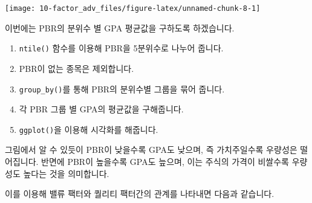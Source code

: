 \documentclass[12pt,]{book}
\newenvironment{Shaded}{\begin{snugshade}}{\end{snugshade}}
\newcommand{\DataTypeTok}[1]{\textcolor[rgb]{0.13,0.29,0.53}{#1}}
\newcommand{\DecValTok}[1]{\textcolor[rgb]{0.00,0.00,0.81}{#1}}
\newcommand{\KeywordTok}[1]{\textcolor[rgb]{0.13,0.29,0.53}{\textbf{#1}}}
\newcommand{\NormalTok}[1]{#1}
\newcommand{\OperatorTok}[1]{\textcolor[rgb]{0.81,0.36,0.00}{\textbf{#1}}}
\newcommand{\OtherTok}[1]{\textcolor[rgb]{0.56,0.35,0.01}{#1}}
\newcommand{\StringTok}[1]{\textcolor[rgb]{0.31,0.60,0.02}{#1}}
\providecommand{\tightlist}{%
  \setlength{\itemsep}{0pt}\setlength{\parskip}{0pt}}
\begin{document}
\begin{Shaded}
\end{Shaded}

\begin{center}\texttt{[image: 10-factor\_adv\_files/figure-latex/unnamed-chunk-8-1]} \end{center}

이번에는 PBR의 분위수 별 GPA 평균값을 구하도록 하겠습니다.

\begin{enumerate}
\def\labelenumi{\arabic{enumi}.}
\tightlist
\item
  \texttt{ntile()} 함수를 이용해 PBR을 5분위수로 나누어 줍니다.
\item
  PBR이 없는 종목은 제외합니다.
\item
  \texttt{group\_by()}를 통해 PBR의 분위수별 그룹을 묶어 줍니다.
\item
  각 PBR 그룹 별 GPA의 평균값을 구해줍니다.
\item
  \texttt{ggplot()}을 이용해 시각화를 해줍니다.
\end{enumerate}

그림에서 알 수 있듯이 PBR이 낮을수록 GPA도 낮으며, 즉 가치주일수록 우량성은 떨어집니다. 반면에 PBR이 높을수록 GPA도 늪으며, 이는 주식의 가격이 비쌀수록 우량성도 높다는 것을 의미합니다.

이를 이용해 밸류 팩터와 퀄리티 팩터간의 관계를 나타내면 다음과 같습니다.
\end{document}
